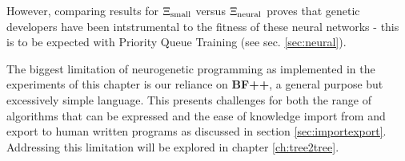 However, comparing results for $\Xi_\text{small}$ versus $\Xi_\text{neural}$ proves that genetic developers have been intstrumental to the fitness of these neural networks - this is to be expected with Priority Queue Training (see sec. \ref{sec:neural}).

The biggest limitation of neurogenetic programming as implemented in the experiments of this chapter is our reliance on \textbf{BF++}, a general purpose but excessively simple language.
This presents challenges for both the range of algorithms that can be expressed and the ease of knowledge import from and export to human written programs as discussed in section \ref{sec:importexport}.
Addressing this limitation will be explored in chapter \ref{ch:tree2tree}.